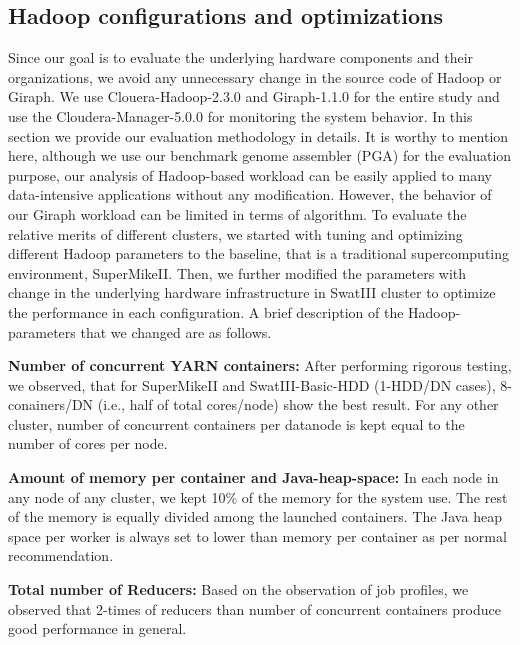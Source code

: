 \documentclass[conference]{IEEEtran}
\begin{document}
\subsection {Hadoop configurations and optimizations} \label{HadoopConfigurationsAndoptimizations}
Since our goal is to evaluate the underlying hardware components and their organizations, we avoid any unnecessary change in the source code of Hadoop or Giraph. 
We use Clouera-Hadoop-2.3.0 and Giraph-1.1.0 for the entire study and use the Cloudera-Manager-5.0.0 for monitoring the system behavior. In this section we provide our evaluation methodology in details. It is worthy to mention here, although we use our benchmark genome assembler (PGA) for the evaluation purpose, our analysis of Hadoop-based workload can be easily applied to many data-intensive applications without any modification. However, the behavior of our Giraph workload can be limited in terms of algorithm.
To evaluate the relative merits of different clusters, we started with tuning and optimizing different Hadoop parameters to the baseline, that is a traditional supercomputing environment, SuperMikeII. Then, we further modified the parameters with change in the underlying hardware infrastructure in SwatIII cluster to optimize the performance in each configuration.
A brief description of the Hadoop-parameters that we changed are as follows.
  
\textbf{Number of concurrent YARN containers:} After performing rigorous testing,  we observed, that for SuperMikeII and SwatIII-Basic-HDD (1-HDD/DN cases), 8-conainers/DN (i.e., half of total cores/node) show the best result. For any other cluster, number of concurrent containers per datanode is kept equal to the number of cores per node. 

\textbf{Amount of memory per container and Java-heap-space:} In each node in any node of any cluster, we kept 10\% of the memory for the system use. The rest of the memory is equally divided among the launched containers. The Java heap space per worker is always set to lower than memory per container as per normal recommendation.

\textbf{Total number of Reducers:} Based on the observation of job profiles, we observed that 2-times of reducers than number of concurrent containers produce good performance in general. 

\end{document}
